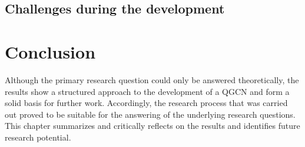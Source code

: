 \begin{table}[h!]
    \centering
    \captionsetup{justification=centering}
       \caption[Comparison of performance metrics of the developed model with different data encoding strategies]{\label{tab:paper02performancecomparison} Comparison of performance metrics of the developed model with different data encoding strategies}
\end{table}

\subsection{Challenges during the development}

\section{Conclusion}
Although the primary research question could only be answered theoretically, the results show a structured approach to the development of a QGCN and form a solid basis for further work. Accordingly, the research process that was carried out proved to be suitable for the answering of the underlying research questions. This chapter summarizes and critically reflects on the results and identifies future research potential.

